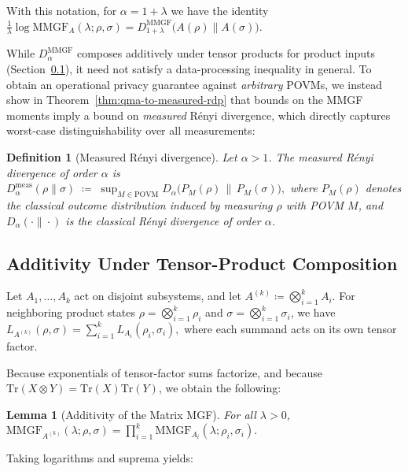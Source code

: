 \documentclass[11pt]{article}
\def\MMGF{\mathrm{MMGF}}
\def\Tr{\mathrm{Tr}}
\theoremstyle{plain}
\newtheorem{lemma}[theo]{Lemma}
\newtheorem{definition}[theo]{Definition}
\theoremstyle{remark}
\begin{document}
With this notation, for $\alpha=1+\lambda$ we have the identity \\  $
\frac{1}{\lambda}\log \mathrm{MMGF}_A(\lambda;\rho,\sigma)
=
D^{\mathrm{MMGF}}_{1+\lambda}\!\big(A(\rho)\|A(\sigma)\big).$

While $D^{\mathrm{MMGF}}_\alpha$ composes additively under tensor products for product inputs
(Section~\ref{sec:additivity}), it need not satisfy a data-processing inequality in general.
To obtain an operational privacy guarantee against \emph{arbitrary} POVMs, we instead show in
Theorem~\ref{thm:qma-to-measured-rdp} that bounds on the MMGF moments imply a bound on \emph{measured} R\'enyi divergence,
which directly captures worst-case distinguishability over all measurements:

\begin{definition}[Measured R\'enyi divergence]
Let $\alpha>1$. The \emph{measured R\'enyi divergence} of order $\alpha$ is
$
D^{\mathrm{meas}}_\alpha(\rho\|\sigma)
\;\coloneqq\;
\sup_{M\in\mathrm{POVM}}
D_\alpha\!\big(P_M(\rho)\,\|\,P_M(\sigma)\big),
$
where $P_M(\rho)$ denotes the classical outcome distribution induced by measuring $\rho$ with POVM
$M$, and $D_\alpha(\cdot\|\cdot)$ is the classical R\'enyi divergence of order $\alpha$.
\end{definition}

\subsection{Additivity Under Tensor-Product Composition}
\label{sec:additivity}

Let $A_1,\dots,A_k$ act on disjoint subsystems, and let $
A^{(k)} \coloneqq \bigotimes_{i=1}^k A_i .
$
For neighboring product states
$\rho = \bigotimes_{i=1}^k \rho_i$ and 
$\sigma = \bigotimes_{i=1}^k \sigma_i$, we have
$
L_{A^{(k)}}(\rho,\sigma)
    = \sum_{i=1}^k L_{A_i}(\rho_i,\sigma_i),
$
where each summand acts on its own tensor factor.

Because exponentials of tensor-factor sums factorize, 
and because $\Tr(X\otimes Y)=\Tr(X)\Tr(Y)$,
we obtain the following:

\begin{lemma}[Additivity of the Matrix MGF]
\label{lemma:mmgf-additivity}
For all $\lambda>0$, \\
$
\MMGF_{A^{(k)}}(\lambda;\rho,\sigma)
    =
    \prod_{i=1}^k
        \MMGF_{A_i}(\lambda;\rho_i,\sigma_i).
$
\end{lemma}
Taking logarithms and suprema yields:
\end{document}
